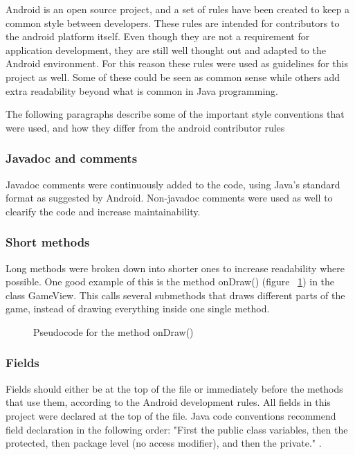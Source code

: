 Android is an open source project, and a set of rules have been created to keep a common style between developers. These rules are intended for contributors to the android platform itself. Even though they are not a requirement for application development, they are still well thought out and adapted to the Android environment. For this reason these rules were used as guidelines for this project as well. Some of these could be seen as common sense while others add extra readability beyond what is common in Java programming.

The following paragraphs describe some of the important style conventions that were used, and how they differ from the android contributor rules

\subsubsection{Javadoc and comments}

Javadoc comments were continuously added to the code, using Java's standard format as suggested by Android. Non-javadoc comments were used as well to clearify the code and increase maintainability.

\subsubsection{Short methods}

Long methods were broken down into shorter ones to increase readability where possible. One good example of this is the method onDraw() (figure ~\ref{fig:codeExOnDraw}) in the class GameView. This calls several submethods that draws different parts of the game, instead of drawing everything inside one single method.

\begin{figure}[htb]
\begin{small}

\end{small}
\caption{Pseudocode for the method onDraw()}
\label{fig:codeExOnDraw}
\end{figure}

\subsubsection{Fields}

Fields should either be at the top of the file or immediately before the methods that use them, according to the Android development rules. All fields in this project were declared at the top of the file. Java code conventions recommend field declaration in the following order: "First the public class variables, then the protected, then package level (no access modifier), and then the private." \citep{Sun}.

